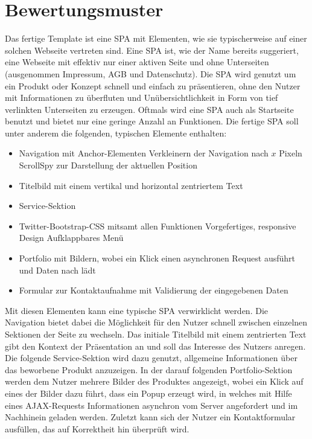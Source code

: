 \section{Bewertungsmuster}
\label{sec:Bewertungsmuster}
Das fertige Template ist eine \ac{SPA} mit Elementen, wie sie typischerweise auf einer solchen Webseite vertreten sind. Eine \ac{SPA} ist, wie der Name bereits suggeriert, eine Webseite mit effektiv nur einer aktiven Seite und ohne Unterseiten (ausgenommen Impressum, AGB und Datenschutz). Die \ac{SPA} wird genutzt um ein Produkt oder Konzept schnell und einfach zu präsentieren, ohne den Nutzer mit Informationen zu überfluten und Unübersichtlichkeit in Form von tief verlinkten Unterseiten zu erzeugen. Oftmals wird eine SPA auch als Startseite benutzt und bietet nur eine geringe Anzahl an Funktionen.
Die fertige \ac{SPA} soll unter anderem die folgenden, typischen Elemente enthalten:
\begin{itemize}
	\item Navigation mit Anchor-Elementen
	\subitem{-} Verkleinern der Navigation nach $x$ Pixeln
	\subitem{-} ScrollSpy zur Darstellung der aktuellen Position
	\item Titelbild mit einem vertikal und horizontal zentriertem Text
	\item Service-Sektion
	\item Twitter-Bootstrap-\ac{CSS} mitsamt allen Funktionen
	\subitem{-} Vorgefertiges, responsive Design
	\subitem{-} Aufklappbares Menü
	\item Portfolio mit Bildern, wobei ein Klick einen asynchronen Request ausführt und Daten nach lädt
	\item Formular zur Kontaktaufnahme mit Validierung der eingegebenen Daten
\end{itemize}
Mit diesen Elementen kann eine typische SPA verwirklicht werden. Die Navigation bietet dabei die Möglichkeit für den Nutzer schnell zwischen einzelnen Sektionen der Seite zu wechseln. Das initiale Titelbild mit einem zentrierten Text gibt den Kontext der Präsentation an und soll das Interesse des Nutzers anregen. Die folgende Service-Sektion wird dazu genutzt, allgemeine Informationen über das beworbene Produkt anzuzeigen. In der darauf folgenden Portfolio-Sektion werden dem Nutzer mehrere Bilder des Produktes angezeigt, wobei ein Klick auf eines der Bilder dazu führt, dass ein Popup erzeugt wird, in welches mit Hilfe eines AJAX-Requests Informationen asynchron vom Server angefordert und im Nachhinein geladen werden. Zuletzt kann sich der Nutzer ein Kontaktformular ausfüllen, das auf Korrektheit hin überprüft wird.


